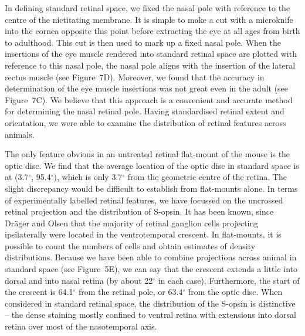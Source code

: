 \documentclass[10pt]{article}
\newcounter{Figure}
\begin{document}
In defining standard retinal space, we fixed the nasal pole with
reference to the centre of the nictitating membrane. It is simple to
make a cut with a microknife into the cornea opposite this point
before extracting the eye at all ages from birth to adulthood. This
cut is then used to mark up a fixed nasal pole. When the insertions
of the eye muscle rendered into standard retinal space are plotted
with reference to this nasal pole, the nasal pole aligns with the
insertion of the lateral rectus muscle (see Figure~7D). Moreover, we
found that the accuracy in determination of the eye muscle insertions
was not great even in the adult (see Figure~7C). We believe that this
approach is a convenient and accurate method for determining the
nasal retinal pole. Having standardised retinal extent and
orientation, we were able to examine the distribution of retinal
features across animals.

The only feature obvious in an untreated retinal flat-mount of the
mouse is the optic disc. We find that the average location of the
optic disc in standard space is at (3.7$^{\circ}$, 95.4$^{\circ}$), which is
only 3.7$^{\circ}$ from the geometric centre of the retina. The slight
discrepancy would be difficult to establish from flat-mounts alone.
In terms of experimentally labelled retinal features, we have
focussed on the uncrossed retinal projection and the distribution of
S-opsin. It has been known, since Dr\"ager and Olsen \cite{DragerOlsen1980} that the majority of retinal ganglion cells projecting
ipsilaterally were located in the ventrotemporal crescent. In
flat-mounts, it is possible to count the numbers of cells and obtain
estimates of density distributions. Because we have been able to
combine projections across animal in standard space (see Figure~5E),
we can say that the crescent extends a little into dorsal and into
nasal retina (by about 22$^{\circ}$ in each case). Furthermore, the start
of the crescent is 64.1$^{\circ}$ from the retinal pole, or 63.4$^{\circ}$
from the optic disc. When considered in standard retinal space, the
distribution of the S-opsin is distinctive -- the dense staining
mostly confined to ventral retina with extensions into dorsal retina
over most of the nasotemporal axis. 
\end{document}
